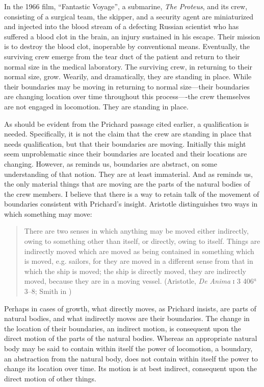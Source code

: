 In the 1966 film, ``Fantastic Voyage'', a submarine, \emph{The Proteus}, and its crew, consisting of a surgical team, the skipper, and a security agent are miniaturized and injected into the blood stream of a defecting Russian scientist who has suffered a blood clot in the brain, an injury sustained in his escape. Their mission is to destroy the blood clot, inoperable by conventional means. Eventually, the surviving crew emerge from the tear duct of the patient and return to their normal size in the medical laboratory. The surviving crew, in returning to their normal size, grow. Wearily, and dramatically, they are standing in place. While their boundaries may be moving in returning to normal size---their boundaries are changing location over time throughout this process----the crew themselves are not engaged in locomotion. They are standing in place.

As should be evident from the Prichard passage cited earlier, a qualification is needed. Specifically, it is not the claim that the crew are standing in place that needs qualification, but that their boundaries are moving. Initially this might seem unproblematic since their boundaries are located and their locations are changing. However, as \citet[103--4]{Derrida:2005aa} reminds us, boundaries are abstract, on some understanding of that notion. They are at least immaterial. And as \citet{Prichard:1950kx} reminds us, the only material things that are moving are the parts of the natural bodies of the crew members. I believe that there is a way to retain talk of the movement of boundaries consistent with Prichard's insight. Aristotle distinguishes two ways in which something may move: 
\begin{quote}
	There are two senses in which anything may be moved either indirectly, owing to something other than itself, or directly, owing to itself. Things are indirectly moved which are moved as being contained in something which is moved, e.g. sailors, for they are moved in a different sense from that in which the ship is moved; the ship is directly moved, they are indirectly moved, because they are in a moving vessel. (Aristotle, \emph{De Anima} \textsc{i} 3 406\( ^{a} \)3--8; Smith in \citealt[9]{Barnes:1984uq})
\end{quote} 
Perhaps in cases of growth, what directly moves, as Prichard insists, are parts of natural bodies, and what indirectly moves are their boundaries. The change in the location of their boundaries, an indirect motion, is consequent upon the direct motion of the parts of the natural bodies. Whereas an appropriate natural body may be said to contain within itself the power of locomotion, a boundary, an abstraction from the natural body, does not contain within itself the power to change its location over time. Its motion is at best indirect, consequent upon the direct motion of other things.

